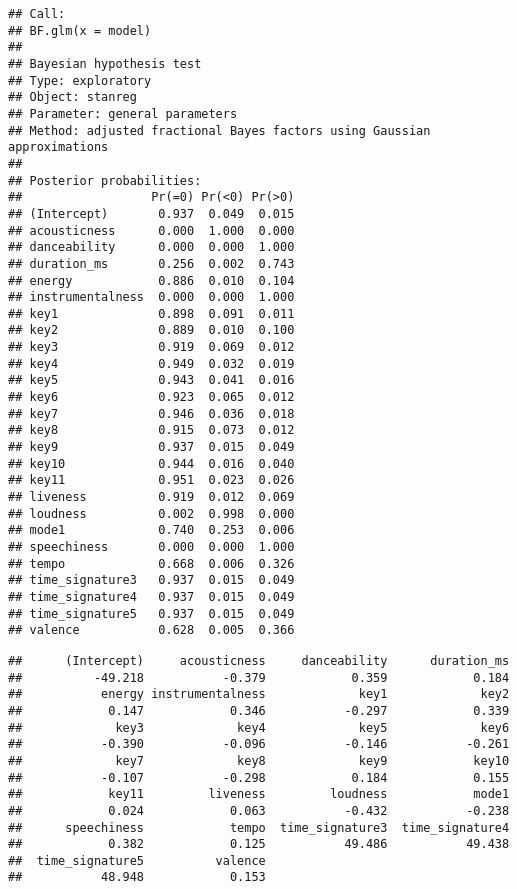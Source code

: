 \documentclass[
]{article}
\begin{document}
\begin{verbatim}
## Call:
## BF.glm(x = model)
## 
## Bayesian hypothesis test
## Type: exploratory
## Object: stanreg
## Parameter: general parameters
## Method: adjusted fractional Bayes factors using Gaussian approximations
## 
## Posterior probabilities:
##                  Pr(=0) Pr(<0) Pr(>0)
## (Intercept)       0.937  0.049  0.015
## acousticness      0.000  1.000  0.000
## danceability      0.000  0.000  1.000
## duration_ms       0.256  0.002  0.743
## energy            0.886  0.010  0.104
## instrumentalness  0.000  0.000  1.000
## key1              0.898  0.091  0.011
## key2              0.889  0.010  0.100
## key3              0.919  0.069  0.012
## key4              0.949  0.032  0.019
## key5              0.943  0.041  0.016
## key6              0.923  0.065  0.012
## key7              0.946  0.036  0.018
## key8              0.915  0.073  0.012
## key9              0.937  0.015  0.049
## key10             0.944  0.016  0.040
## key11             0.951  0.023  0.026
## liveness          0.919  0.012  0.069
## loudness          0.002  0.998  0.000
## mode1             0.740  0.253  0.006
## speechiness       0.000  0.000  1.000
## tempo             0.668  0.006  0.326
## time_signature3   0.937  0.015  0.049
## time_signature4   0.937  0.015  0.049
## time_signature5   0.937  0.015  0.049
## valence           0.628  0.005  0.366
\end{verbatim}

\begin{verbatim}
##      (Intercept)     acousticness     danceability      duration_ms 
##          -49.218           -0.379            0.359            0.184 
##           energy instrumentalness             key1             key2 
##            0.147            0.346           -0.297            0.339 
##             key3             key4             key5             key6 
##           -0.390           -0.096           -0.146           -0.261 
##             key7             key8             key9            key10 
##           -0.107           -0.298            0.184            0.155 
##            key11         liveness         loudness            mode1 
##            0.024            0.063           -0.432           -0.238 
##      speechiness            tempo  time_signature3  time_signature4 
##            0.382            0.125           49.486           49.438 
##  time_signature5          valence 
##           48.948            0.153
\end{verbatim}
\end{document}
